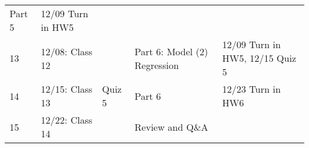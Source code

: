 \documentclass[
]{book}
\begin{document}
\begin{longtable}[]{@{}lllll@{}}
\begin{minipage}[t]{0.32\columnwidth}
Part 5\strut
\end{minipage} & \begin{minipage}[t]{0.22\columnwidth}\raggedright
12/09 Turn in HW5\strut
\end{minipage}\tabularnewline
\begin{minipage}[t]{0.08\columnwidth}\raggedright
13\strut
\end{minipage} & \begin{minipage}[t]{0.17\columnwidth}\raggedright
12/08: Class 12\strut
\end{minipage} & \begin{minipage}[t]{0.08\columnwidth}\raggedright
\strut
\end{minipage} & \begin{minipage}[t]{0.32\columnwidth}\raggedright
Part 6: Model (2) Regression\strut
\end{minipage} & \begin{minipage}[t]{0.22\columnwidth}\raggedright
12/09 Turn in HW5, 12/15 Quiz 5\strut
\end{minipage}\tabularnewline
\begin{minipage}[t]{0.08\columnwidth}\raggedright
14\strut
\end{minipage} & \begin{minipage}[t]{0.17\columnwidth}\raggedright
12/15: Class 13\strut
\end{minipage} & \begin{minipage}[t]{0.08\columnwidth}\raggedright
Quiz 5\strut
\end{minipage} & \begin{minipage}[t]{0.32\columnwidth}\raggedright
Part 6\strut
\end{minipage} & \begin{minipage}[t]{0.22\columnwidth}\raggedright
12/23 Turn in HW6\strut
\end{minipage}\tabularnewline
\begin{minipage}[t]{0.08\columnwidth}\raggedright
15\strut
\end{minipage} & \begin{minipage}[t]{0.17\columnwidth}\raggedright
12/22: Class 14\strut
\end{minipage} & \begin{minipage}[t]{0.08\columnwidth}\raggedright
\strut
\end{minipage} & \begin{minipage}[t]{0.32\columnwidth}\raggedright
Review and Q\&A\strut
\end{minipage} & \begin{minipage}[t]{0.22\columnwidth}\raggedright

\end{minipage}
\end{longtable}
\end{document}
